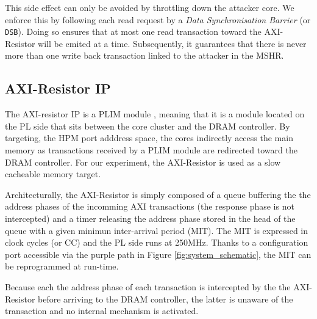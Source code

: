         This side effect can only be avoided by throttling down the attacker core.
        We enforce this by following each read request by a \emph{Data Synchronisation Barrier} (or \texttt{DSB}).
        Doing so ensures that at most one read transaction toward the AXI-Resistor will be emited at a time.
        Subsequently, it guarantees that there is never more than one write back transaction linked to the attacker in the MSHR.

    \subsection{AXI-Resistor IP}
        \label{subsec:axi-resistor}
        The AXI-resistor IP is a PLIM module \cite{PLIM20}, meaning that it is a module located on the PL side that sits between the core cluster and the DRAM controller.
        By targeting, the HPM port adddress space, the cores indirectly access the main memory as transactions received by a PLIM module are redirected toward the DRAM controller.
        For our experiment, the AXI-Resistor is used as a slow cacheable memory target.

        Architecturally, the AXI-Resistor is simply composed of a queue buffering the the address phases of the incomming AXI transactions \cite{ARM-AXI} (the response phase is not intercepted) and a timer releasing the address phase stored in the head of the queue with a given minimun inter-arrival period (MIT).
        The MIT is expressed in clock cycles (or CC) and the PL side runs at 250MHz.
        Thanks to a configuration port accessible via the purple path in Figure \ref{fig:system_schematic}, the MIT can be reprogrammed at run-time.

        Because each the address phase of each transaction is intercepted by the the AXI-Resistor before arriving to the DRAM controller, the latter is unaware of the transaction and no internal mechanism is activated.
